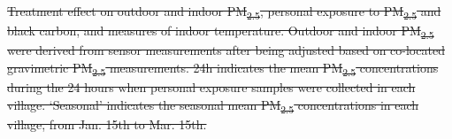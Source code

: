 \documentclass[
  letterpaper,
  DIV=11,
  numbers=noendperiod]{scrartcl}
\makeatletter
\renewenvironment{table}%
   {\renewcommand\familydefault\sfdefault
    \@float{table}}
   {\end@float}
\providecommand{\DIFdel}[1]{{\protect\color{red}\sout{#1}}}                      %
\providecommand{\DIFdelbegin}{} %
\providecommand{\DIFdelend}{} %
\providecommand{\DIFdelFL}[1]{\DIFdel{#1}} %
\providecommand{\DIFdelbeginFL}{} %
\providecommand{\DIFdelendFL}{} %
\newcommand{\DIFscaledelfig}{0.5}
\newlength{\DIFdelgraphicswidth} %
\newlength{\DIFdelgraphicsheight} %
\newcommand{\DIFdelincludegraphics}[2][]{%
\sbox{\DIFdelgraphicsbox}{\DIFOincludegraphics[#1]{#2}}%
\settoboxwidth{\DIFdelgraphicswidth}{\DIFdelgraphicsbox} %
\settoboxtotalheight{\DIFdelgraphicsheight}{\DIFdelgraphicsbox} %
\scalebox{\DIFscaledelfig}{%
\parbox[b]{\DIFdelgraphicswidth}{\usebox{\DIFdelgraphicsbox}\\[-\baselineskip] \rule{\DIFdelgraphicswidth}{0em}}\llap{\resizebox{\DIFdelgraphicswidth}{\DIFdelgraphicsheight}{%
\setlength{\unitlength}{\DIFdelgraphicswidth}%
\begin{picture}(1,1)%
\thicklines\linethickness{2pt} %
{\color[rgb]{1,0,0}\put(0,0){\framebox(1,1){}}}%
{\color[rgb]{1,0,0}\put(0,0){\line( 1,1){1}}}%
{\color[rgb]{1,0,0}\put(0,1){\line(1,-1){1}}}%
\end{picture}%
}\hspace*{3pt}}} %
} %
\DeclareRobustCommand{\DIFdelbegin}{\DIFOdelbegin \let\includegraphics\DIFdelincludegraphics} %
\DeclareRobustCommand{\DIFdelend}{\DIFOaddend \let\includegraphics\DIFOincludegraphics} %
\DeclareRobustCommand{\DIFdelbeginFL}{\DIFOdelbeginFL \let\includegraphics\DIFdelincludegraphics} %
\DeclareRobustCommand{\DIFdelendFL}{\DIFOaddendFL \let\includegraphics\DIFOincludegraphics} %
\makeatother
\begin{document}
\DIFdelbegin %
\DIFdelend \begin{table}
\DIFdelbeginFL %
{%
\DIFdelFL{Treatment effect on outdoor and indoor PM\textsubscript{2.5}, personal
exposure to PM\textsubscript{2.5} and black carbon, and measures of
indoor temperature. Outdoor and indoor PM\textsubscript{2.5} were
derived from sensor measurements after being adjusted based on
co-located gravimetric PM\textsubscript{2.5} measurements. 24h indicates
the mean PM\textsubscript{2.5} concentrations during the 24 hours when
personal exposure samples were collected in each village. `Seasonal'
indicates the seasonal mean PM\textsubscript{2.5} concentrations in each
village, from Jan. 15th to Mar. 15th. }}%
\DIFdelendFL 


\end{table}
\end{document}
